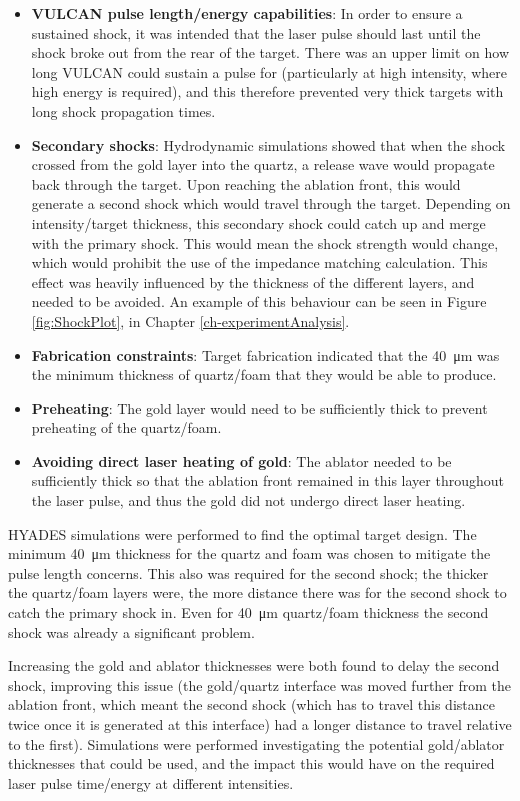 \begin{itemize}
    \item \textbf{VULCAN pulse length/energy capabilities}: In order to ensure a sustained shock, it was intended that the laser pulse should last until the shock broke out from the rear of the target. There was an upper limit on how long VULCAN could sustain a pulse for (particularly at high intensity, where high energy is required), and this therefore prevented very thick targets with long shock propagation times.
    \item \textbf{Secondary shocks}: Hydrodynamic simulations showed that when the shock crossed from the gold layer into the quartz, a release wave would propagate back through the target. Upon reaching the ablation front, this would generate a second shock which would travel through the target. Depending on intensity/target thickness, this secondary shock could catch up and merge with the primary shock. This would mean the shock strength would change, which would prohibit the use of the impedance matching calculation. This effect was heavily influenced by the thickness of the different layers, and needed to be avoided. An example of this behaviour can be seen in Figure \ref{fig:ShockPlot}, in Chapter \ref{ch-experimentAnalysis}.
    \item \textbf{Fabrication constraints}: Target fabrication indicated that the 40~\unit{\micro\meter} was the minimum thickness of quartz/foam that they would be able to produce.
    \item \textbf{Preheating}: The gold layer would need to be sufficiently thick to prevent preheating of the quartz/foam. 
    \item \textbf{Avoiding direct laser heating of gold}: The ablator needed to be sufficiently thick so that the ablation front remained in this layer throughout the laser pulse, and thus the gold did not undergo direct laser heating.
\end{itemize}

HYADES simulations were performed to find the optimal target design. The minimum 40~\unit{\micro\meter} thickness for the quartz and foam was chosen to mitigate the pulse length concerns. This also was required for the second shock; the thicker the quartz/foam layers were, the more distance there was for the second shock to catch the primary shock in. Even for 40~\unit{\micro\meter} quartz/foam thickness the second shock was already a significant problem. 

Increasing the gold and ablator thicknesses were both found to delay the second shock, improving this issue (the gold/quartz interface was moved further from the ablation front, which meant the second shock (which has to travel this distance twice once it is generated at this interface) had a longer distance to travel relative to the first). Simulations were performed investigating the potential gold/ablator thicknesses that could be used, and the impact this would have on the required laser pulse time/energy at different intensities.

